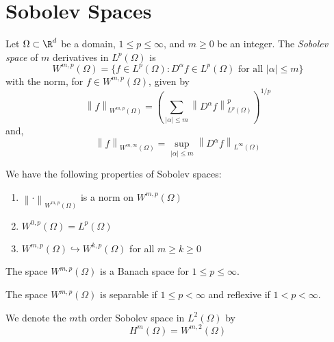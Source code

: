 \documentclass{article}
\newcommand{\norm}[1]{\left\lVert#1\right\rVert}
\begin{document}
\section{Sobolev Spaces}
\begin{definition}
  Let $\Omega \subset \R^d$ be a domain, $1 \leq p \leq \infty$, and $m \geq 0$ be an integer. The \textit{Sobolev space} of $m$ derivatives in $L^p(\Omega)$ is 
  \begin{equation*}
    W^{m,p}(\Omega) = \{f \in L^p(\Omega): D^\alpha f \in L^p(\Omega) \text{ for all $|\alpha| \leq m$}\}
  \end{equation*}
  with the norm, for $f \in W^{m,p}(\Omega)$, given by
  \begin{equation*}
    \norm{f}_{W^{m,p}(\Omega)} = \left(\sum_{|\alpha| \leq m} \norm{D^\alpha f}_{L^p(\Omega)}^p\right)^{1/p}
  \end{equation*}
  and,
  \begin{equation*}
    \norm{f}_{W^{m,\infty}(\Omega)} = \sup_{|\alpha| \leq m} \norm{D^\alpha f}_{L^\infty(\Omega)}
  \end{equation*}
\end{definition}

\begin{proposition}
  We have the following properties of Sobolev spaces:
  \begin{enumerate}
    \item $\norm{\cdot}_{W^{m,p}(\Omega)}$ is a norm on $W^{m,p}(\Omega)$
    \item $W^{0,p}(\Omega) = L^p(\Omega)$
    \item $W^{m,p}(\Omega) \hookrightarrow W^{k,p}(\Omega)$ for all $m \geq k \geq 0$
  \end{enumerate}
\end{proposition}


\begin{proposition}
  The space $W^{m,p}(\Omega)$ is a Banach space for $1 \leq p \leq \infty$.
\end{proposition}

\begin{proposition}
  The space $W^{m,p}(\Omega)$ is separable if $1 \leq p < \infty$ and reflexive if $1 < p < \infty$.
\end{proposition}

\begin{definition}
  We denote the $m$th order Sobolev space in $L^2(\Omega)$ by 
  \begin{equation*}
    H^m(\Omega) = W^{m,2}(\Omega)
  \end{equation*}
\end{definition}
\end{document}
